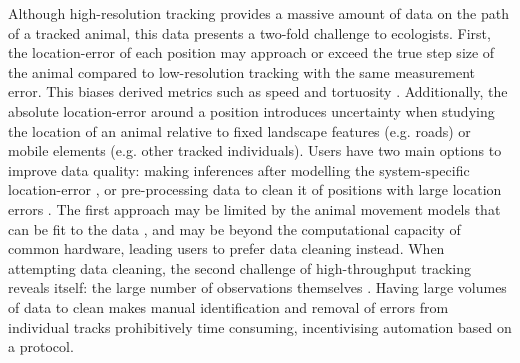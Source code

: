 \documentclass[10pt,paper=a4,headings=standardclasses
]{scrartcl}
\begin{document}
Although high-resolution tracking provides a massive amount of data on the path of a tracked animal, this data presents a two-fold challenge to ecologists.
First, the location-error of each position may approach or exceed the true step size of the animal compared to low-resolution tracking with the same measurement error.
This biases derived metrics such as speed and tortuosity \citep[see][]{ranacher2016, noonan2019, hurford2009, calenge2009}.
Additionally, the absolute location-error around a position introduces uncertainty when studying the location of an animal relative to fixed landscape features (e.g. roads) or mobile elements (e.g. other tracked individuals).
Users have two main options to improve data quality: making inferences after modelling the system-specific location-error \citep{fleming2014a, fleming2020, jonsen2003, jonsen2005, johnson2008, patterson2008, aspillaga2021}, or pre-processing data to clean it of positions with large location errors \citep{bjorneraas2010}.
The first approach may be limited by the animal movement models that can be fit to the data \citep{fleming2014a, noonan2019, fleming2020}, and may be beyond the computational capacity of common hardware, leading users to prefer data cleaning instead.
When attempting data cleaning, the second challenge of high-throughput tracking reveals itself: the large number of observations themselves \citep{weiser2016, toledo2020}.
Having large volumes of data to clean makes manual identification and removal of errors from individual tracks prohibitively time consuming, incentivising automation based on a protocol.
\end{document}
